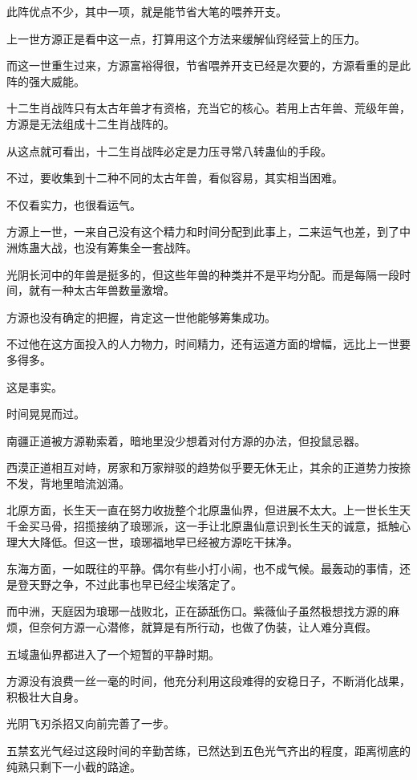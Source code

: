 \begin{this_body}
此阵优点不少，其中一项，就是能节省大笔的喂养开支。

上一世方源正是看中这一点，打算用这个方法来缓解仙窍经营上的压力。

而这一世重生过来，方源富裕得很，节省喂养开支已经是次要的，方源看重的是此阵的强大威能。

十二生肖战阵只有太古年兽才有资格，充当它的核心。若用上古年兽、荒级年兽，方源是无法组成十二生肖战阵的。

从这点就可看出，十二生肖战阵必定是力压寻常八转蛊仙的手段。

不过，要收集到十二种不同的太古年兽，看似容易，其实相当困难。

不仅看实力，也很看运气。

方源上一世，一来自己没有这个精力和时间分配到此事上，二来运气也差，到了中洲炼蛊大战，也没有筹集全一套战阵。

光阴长河中的年兽是挺多的，但这些年兽的种类并不是平均分配。而是每隔一段时间，就有一种太古年兽数量激增。

方源也没有确定的把握，肯定这一世他能够筹集成功。

不过他在这方面投入的人力物力，时间精力，还有运道方面的增幅，远比上一世要多得多。

这是事实。

时间晃晃而过。

南疆正道被方源勒索着，暗地里没少想着对付方源的办法，但投鼠忌器。

西漠正道相互对峙，房家和万家辩驳的趋势似乎要无休无止，其余的正道势力按捺不发，背地里暗流汹涌。

北原方面，长生天一直在努力收拢整个北原蛊仙界，但进展不太大。上一世长生天千金买马骨，招揽接纳了琅琊派，这一手让北原蛊仙意识到长生天的诚意，抵触心理大大降低。但这一世，琅琊福地早已经被方源吃干抹净。

东海方面，一如既往的平静。偶尔有些小打小闹，也不成气候。最轰动的事情，还是登天野之争，不过此事也早已经尘埃落定了。

而中洲，天庭因为琅琊一战败北，正在舔舐伤口。紫薇仙子虽然极想找方源的麻烦，但奈何方源一心潜修，就算是有所行动，也做了伪装，让人难分真假。

五域蛊仙界都进入了一个短暂的平静时期。

方源没有浪费一丝一毫的时间，他充分利用这段难得的安稳日子，不断消化战果，积极壮大自身。

光阴飞刃杀招又向前完善了一步。

五禁玄光气经过这段时间的辛勤苦练，已然达到五色光气齐出的程度，距离彻底的纯熟只剩下一小截的路途。


\end{this_body}
